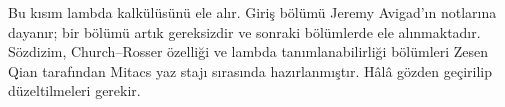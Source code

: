 


\begin{editorial}
Bu kısım lambda kalkülüsünü ele alır. Giriş bölümü Jeremy Avigad'ın
notlarına dayanır; bir bölümü artık gereksizdir ve sonraki bölümlerde ele
alınmaktadır. Sözdizim, Church--Rosser özelliği ve lambda tanımlanabilirliği
bölümleri Zesen Qian tarafından Mitacs yaz stajı sırasında hazırlanmıştır.
Hâlâ gözden geçirilip düzeltilmeleri gerekir.
\end{editorial}





\OLEndPartHook


